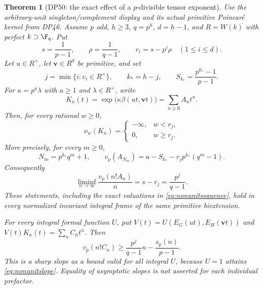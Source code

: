 \documentclass[11pt,a4paper]{article}
\newtheorem{theorem}{Theorem}[section]
\theoremstyle{definition}\newtheorem{remark}[theorem]{Remark}
\newcommand{\vp}{v_p}\newcommand{\dR}{\mathrm{dR}}\newcommand{\crys}{\mathrm{crys}}
\begin{document}
\begin{theorem}[DP50: the exact effect of a $p$-divisible tensor exponent]\label{DP50}
Use the arbitrary-unit singleton/complement display and its actual primitive Poincar\'e kernel from DP46. Assume $p$ odd, $h\ge3$, $q=p^h$, $d=h-1$, and $R=W(k)$ with perfect $k\supset\F_q$. Put
\[
 s=\frac1{p-1},\qquad \rho=\frac1{q-1},\qquad
 r_i=s-p^i\rho\quad(1\le i\le d).
\]
Let $u\in R^\times$, let $\mathbf v\in R^d$ be primitive, and set
\[
 j=\min\{i:v_i\in R^\times\},\qquad
 k_*=h-j,\qquad S_{k_*}=\frac{p^{k_*}-1}{p-1}.
\]
For $\kappa=p^a\lambda$ with $a\ge1$ and $\lambda\in R^\times$, write
\[
 K_\kappa(t)=\exp\bigl(\kappa\beta(ut,\mathbf vt)\bigr)
       =\sum_{n\ge0}A_nt^n.
\]
Then, for every rational $w\ge0$,
\begin{equation}\label{eq:nonunitradius}
 \nu_w(K_\kappa)=
 \begin{cases}-\infty,&w<r_j,\\0,&w\ge r_j.\end{cases}
\end{equation}
More precisely, for every $m\ge0$,
\begin{equation}\label{eq:nonunitsequence}
 N_m=p^{k_*}q^m+1,\qquad
 \vp(A_{N_m})=a-S_{k_*}-r_jp^{k_*}(q^m-1).
\end{equation}
Consequently
\begin{equation}\label{eq:nonunitslope}
 \liminf_{n\to\infty}\frac{\vp(n!A_n)}n
       =s-r_j=\frac{p^j}{q-1}.
\end{equation}
These statements, including the exact valuations in
\eqref{eq:nonunitsequence}, hold in every normalized invariant integral frame of the same primitive biextension.

For every integral formal function $U$, put
$V(t)=U(E_G(ut),E_H(\mathbf vt))$ and
$V(t)K_\kappa(t)=\sum_n C_nt^n$. Then
\begin{equation}\label{eq:nonunitprefactor}
 \vp(n!C_n)\ge\frac{p^j}{q-1}n-\frac{s_p(n)}{p-1}.
\end{equation}
This is a sharp slope as a bound valid for all integral $U$, because $U=1$ attains \eqref{eq:nonunitslope}. Equality of asymptotic slopes is not asserted for each individual prefactor.
\end{theorem}
\end{document}

